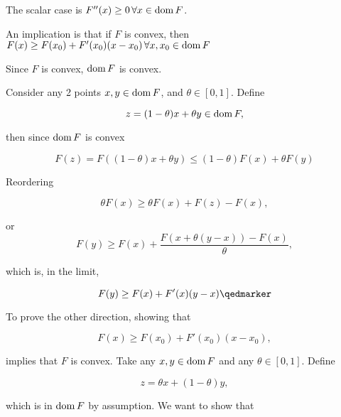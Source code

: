 The scalar case is \( F''(x) \ge 0 \, \forall x \in \operatorname{dom} F \).

An implication is that if \( F \) is convex, then \( F(x) \ge F(x_0) + F'(x_0) (x - x_0) \,\forall x, x_0 \in \operatorname{dom} F\)

Since \( F \) is convex, \( \operatorname{dom} F \) is convex.

Consider any 2 points \( x, y \in \operatorname{dom} F \), and \( \theta \in [0,1] \).  Define

\begin{equation}\label{eqn:convexOptimizationLecture6:60}
z = (1-\theta) x + \theta y \in \operatorname{dom} F,
\end{equation}

then since \( \operatorname{dom} F \) is convex

\begin{dmath}\label{eqn:convexOptimizationLecture6:80}
F(z) =
F( (1-\theta) x + \theta y )
\le
(1-\theta) F(x) + \theta F(y )
\end{dmath}

Reordering

\begin{dmath}\label{eqn:convexOptimizationLecture6:220}
\theta F(x) \ge
\theta F(x) + F(z) - F(x),
\end{dmath}

or
\begin{dmath}\label{eqn:convexOptimizationLecture6:100}
F(y) \ge
F(x) + \frac{F(x + \theta(y-x)) - F(x)}{\theta},
\end{dmath}

which is, in the limit,

\begin{dmath}\label{eqn:convexOptimizationLecture6:120}
F(y) \ge
F(x) + F'(x) (y - x)\qedmarker
\end{dmath}

To prove the other direction, showing that

\begin{dmath}\label{eqn:convexOptimizationLecture6:140}
F(x) \ge F(x_0) + F'(x_0) (x - x_0),
\end{dmath}

implies that \( F \) is convex.
Take any \( x, y \in \operatorname{dom} F \) and any \( \theta \in [0,1] \).  Define

\begin{dmath}\label{eqn:convexOptimizationLecture6:160}
z = \theta x + (1 -\theta) y,
\end{dmath}

which is in \( \operatorname{dom} F \) by assumption.  We want to show that

